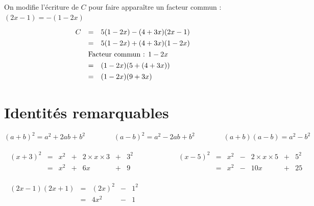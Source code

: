 \begin{methode}
\begin{correction}
\[\begin{array}{ll}
\begin{array}{rcl}
				\end{array}%
			\end{array}%
		\]
		\ms
		On modifie l'écriture de $C$ pour faire apparaître un facteur commun : $(2x - 1) = -(1 - 2x)$
		\[
			\def\arraystretch{1.3}%
			\begin{array}{rcl}%
				C & =                                                 & 5(1 - 2x) - (4 + 3x)(2x - 1) \\
				  & =                                                 & 5(1 - 2x) + (4 + 3x)(1 - 2x) \\
				  & \multicolumn{2}{l}{\text{Facteur commun : } 1-2x}                                \\
				  & =                                                 & (1 - 2x)(5 + (4 + 3x))       \\
				  & =                                                 & (1 - 2x)(9 + 3x)             \\
			\end{array}%
		\]
	\end{correction}
\end{methode}

\newpage

\section{Identités remarquables}

\begin{prop}
	\[
		\boxed{(a+b)^2 = a^2 + 2ab + b^2} \qquad\qquad \boxed{(a-b)^2 = a^2 - 2ab + b^2} \qquad\qquad \boxed{(a+b)(a-b) = a^2 - b^2}
	\]
\end{prop}

\begin{ex}
	\[
		\begin{array}{ll}%
			\begin{array}{rcccccl}%
				(x + 3)^2 & = & x^2 & + & 2 \times x \times 3 & + & 3^2 \\
				          & = & x^2 & + & 6x                  & + & 9   \\
			\end{array}\qquad & \qquad %
			\begin{array}{rcccccl}%
				(x - 5)^2 & = & x^2 & - & 2 \times x \times 5 & + & 5^2 \\
				          & = & x^2 & - & 10x                 & + & 25  \\
			\end{array} \\ & \\%
			\begin{array}{rcccl}%
				(2x - 1)(2x + 1) & = & (2x)^2 & - & 1^2 \\
				                 & = & 4x^2   & - & 1
			\end{array}\qquad      & \qquad~    %
		\end{array}%
	\]
\end{ex}

